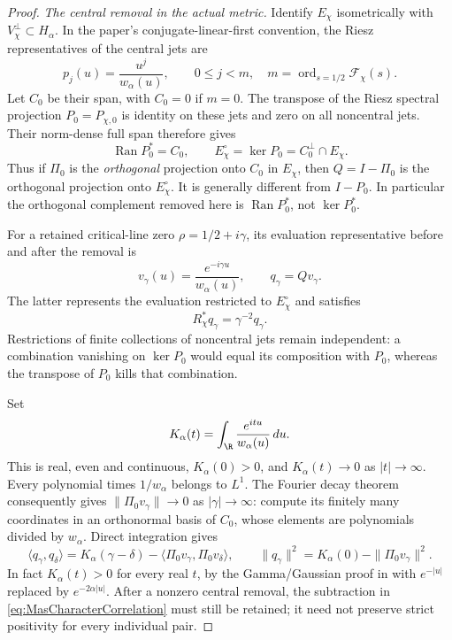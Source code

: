 \begin{proof}
\emph{The central removal in the actual metric.}
Identify $E_\chi$ isometrically with $V_\chi^\perp\subset H_\alpha$. In the paper's conjugate-linear-first convention, the Riesz representatives of the central jets are
\[
 p_j(u)=\frac{u^j}{w_\alpha(u)},\qquad 0\le j<m,
 \quad m=\operatorname{ord}_{s=1/2}\mathcal F_\chi(s).
\]
Let $C_0$ be their span, with $C_0=0$ if $m=0$. The transpose of the Riesz spectral projection $P_0=P_{\chi,0}$ is identity on these jets and zero on all noncentral jets. Their norm-dense full span therefore gives
\[
 \operatorname{Ran}P_0^*=C_0,\qquad
 E_\chi^\circ=\ker P_0=C_0^\perp\cap E_\chi.
\]
Thus if $\Pi_0$ is the \emph{orthogonal} projection onto $C_0$ in $E_\chi$, then $Q=I-\Pi_0$ is the orthogonal projection onto $E_\chi^\circ$. It is generally different from $I-P_0$. In particular the orthogonal complement removed here is $\operatorname{Ran}P_0^*$, not $\ker P_0^*$.

For a retained critical-line zero $\rho=1/2+i\gamma$, its evaluation representative before and after the removal is
\[
 v_\gamma(u)=\frac{e^{-i\gamma u}}{w_\alpha(u)},\qquad
 q_\gamma=Qv_\gamma.
\]
The latter represents the evaluation restricted to $E_\chi^\circ$ and satisfies
\[
 R_\chi^*q_\gamma=\gamma^{-2}q_\gamma.
\]
Restrictions of finite collections of noncentral jets remain independent: a combination vanishing on $\ker P_0$ would equal its composition with $P_0$, whereas the transpose of $P_0$ kills that combination.

Set
\[
 K_\alpha(t)=\int_\R\frac{e^{itu}}{w_\alpha(u)}\,du.
\]
This is real, even and continuous, $K_\alpha(0)>0$, and $K_\alpha(t)\to0$ as $|t|\to\infty$. Every polynomial times $1/w_\alpha$ belongs to $L^1$. The Fourier decay theorem consequently gives $\|\Pi_0v_\gamma\|\to0$ as $|\gamma|\to\infty$: compute its finitely many coordinates in an orthonormal basis of $C_0$, whose elements are polynomials divided by $w_\alpha$. Direct integration gives
\begin{equation}\label{eq:MasCharacterCorrelation}
 \langle q_\gamma,q_\delta\rangle
 =K_\alpha(\gamma-\delta)
  -\langle\Pi_0v_\gamma,\Pi_0v_\delta\rangle,
 \qquad
 \|q_\gamma\|^2=K_\alpha(0)-\|\Pi_0v_\gamma\|^2.
\end{equation}
In fact $K_\alpha(t)>0$ for every real $t$, by the Gamma/Gaussian proof in  with $e^{-|u|}$ replaced by $e^{-2\alpha|u|}$. After a nonzero central removal, the subtraction in \eqref{eq:MasCharacterCorrelation} must still be retained; it need not preserve strict positivity for every individual pair.


\end{proof}
